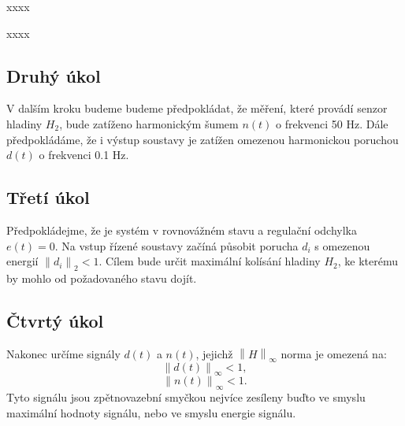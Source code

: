 \documentclass[a4paper,11pt]{article}
\begin{document}
xxxx

xxxx

\newpage 
\subsection{Druhý úkol}
V dalším kroku budeme budeme předpokládat, že měření, které provádí senzor hladiny $ H_{2} $, bude zatíženo harmonickým šumem $ n\left ( t \right ) $ o frekvenci 50 Hz. Dále předpokládáme, že i výstup soustavy je zatížen omezenou harmonickou poruchou $ d\left ( t \right ) $ o frekvenci 0.1 Hz. 



\subsection{Třetí úkol}
Předpokládejme, že je systém v rovnovážném stavu a regulační odchylka $ e\left ( t \right )=0 $. Na vstup řízené soustavy začíná působit porucha $ d_{i} $ s omezenou energií $ \left \| d_{i} \right \|_{2}<1 $. Cílem bude určit maximální kolísání hladiny $ H_{2} $, ke kterému by mohlo od požadovaného stavu dojít.

\subsection{Čtvrtý úkol}
Nakonec určíme signály $ d\left ( t \right ) $ a $ n\left ( t \right )  $, jejichž $ \left \| H \right \|_{\infty } $ norma je omezená na:
\begin{equation}
\left \| d\left ( t \right ) \right \|_{\infty }<1,
\end{equation}
\begin{equation}
\left \| n\left ( t \right ) \right \|_{\infty }<1.
\end{equation}
Tyto signálu jsou zpětnovazební smyčkou nejvíce zesíleny buďto ve smyslu maximální hodnoty signálu, nebo ve smyslu energie signálu.
\end{document}
